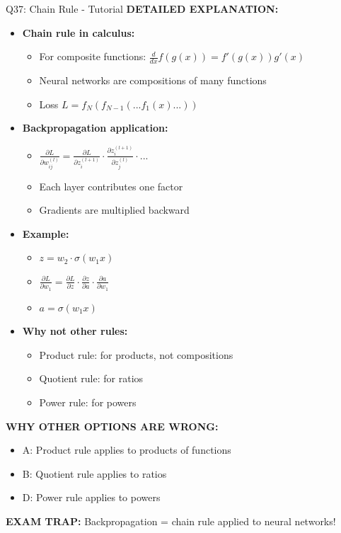 \documentclass[8pt]{beamer}
\begin{document}
\begin{frame}{Q37: Chain Rule - Tutorial}
		\vspace{0.05cm}
		\textbf{DETAILED EXPLANATION:}
		\begin{itemize}
			\item \textbf{Chain rule in calculus:}
			\begin{itemize}
				\item For composite functions: $\frac{d}{dx} f(g(x)) = f'(g(x)) g'(x)$
				\item Neural networks are compositions of many functions
				\item Loss $L = f_N(f_{N-1}(... f_1(x)...))$
			\end{itemize}
			\item \textbf{Backpropagation application:}
			\begin{itemize}
				\item $\frac{\partial L}{\partial w_{ij}^{(l)}} = \frac{\partial L}{\partial z_i^{(l+1)}} \cdot \frac{\partial z_i^{(l+1)}}{\partial z_j^{(l)}} \cdot ...$
				\item Each layer contributes one factor
				\item Gradients are multiplied backward
			\end{itemize}
			\item \textbf{Example:}
			\begin{itemize}
				\item $z = w_2 \cdot \sigma(w_1 x)$
				\item $\frac{\partial L}{\partial w_1} = \frac{\partial L}{\partial z} \cdot \frac{\partial z}{\partial a} \cdot \frac{\partial a}{\partial w_1}$
				\item $a = \sigma(w_1 x)$
			\end{itemize}
			\item \textbf{Why not other rules:}
			\begin{itemize}
				\item Product rule: for products, not compositions
				\item Quotient rule: for ratios
				\item Power rule: for powers
			\end{itemize}
		\end{itemize}
		
		\vspace{0.05cm}
		\textcolor{myred}{\textbf{WHY OTHER OPTIONS ARE WRONG:}}
		\begin{itemize}
			\item \textcolor{myred}{A:} Product rule applies to products of functions
			\item \textcolor{myred}{B:} Quotient rule applies to ratios
			\item \textcolor{myred}{D:} Power rule applies to powers
		\end{itemize}
		
		\textcolor{myred}{\textbf{EXAM TRAP:}} Backpropagation = \textcolor{myblue}{chain rule} applied to neural networks!
	\end{frame}
	
\end{document}
